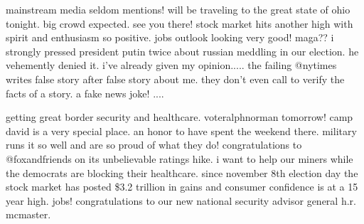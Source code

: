 \documentclass[10pt,twoside,fleqn,english,french]{actuecon}
\begin{document}
	\AEconclusion
	
		mainstream media seldom mentions! will be traveling to the great state of ohio tonight. big crowd expected. see you there! stock market hits another high with spirit and enthusiasm so positive. jobs outlook looking very good! maga?? i strongly pressed president putin twice about russian meddling in our election. he vehemently denied it. i've already given my opinion..... the failing @nytimes writes false story after false story about me. they don't even call to verify the facts of a story. a fake news joke! ....
		
		getting great border security and healthcare. voteralphnorman tomorrow! camp david is a very special place. an honor to have spent the weekend there. military runs it so well and are so proud of what they do! congratulations to @foxandfriends on its unbelievable ratings hike. i want to help our miners while the democrats are blocking their healthcare. since november 8th election day the stock market has posted \$3.2 trillion in gains and consumer confidence is at a 15 year high. jobs! congratulations to our new national security advisor general h.r. mcmaster. 
							
	\AEbibliographie
	\nocite{*}
	
	
		
\end{document}
